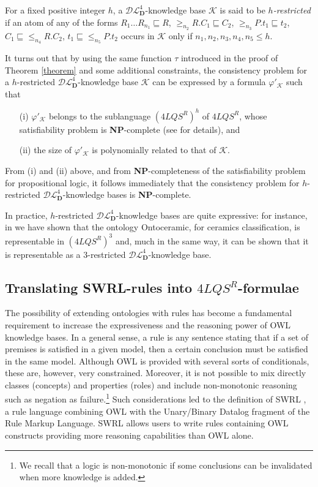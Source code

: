 \documentclass[a4paper]{llncs}
\newcommand{\shdlss}{\mathcal{DL}_{\D}^{4}}
\newcommand{\flqsr}{\ensuremath{4LQS^R}}
\newcommand{\D}{\mathbf{D}}
\begin{document}
\begin{remark}
For a fixed positive integer $h$, a $\shdlss$-knowledge base $\mathcal{K}$ is said to be \emph{$h$-restricted} if an atom of any of the forms $R_1\ldots R_{n_1} \sqsubseteq R$, $\geq_{n_2} \!\!R.C_1 \sqsubseteq C_2$, $\geq_{n_3} \!\!P.t_1 \sqsubseteq t_2$, $C_1 \sqsubseteq {\leq_{n_4} \!\!R. C_2}$, $t_1 \sqsubseteq {\leq_{n_5} \!\!P. t_2}$ occurs in $\mathcal{K}$ only if $n_1,n_2,n_3,n_4,n_5 \leq h$.

It turns out that by using the same function
$\tau$ introduced in the proof of Theorem \ref{theorem} and some additional constraints, the consistency problem for a $h$-restricted $\shdlss$-knowledge base $\mathcal{K}$ can be expressed by a formula $\varphi'_\mathcal{K}$ such that
\begin{itemize}
\item[(i)] $\varphi'_\mathcal{K}$ belongs to the sublanguage $(\flqsr)^h$ of \flqsr, whose satisfiability problem is \textbf{NP}-complete (see \cite{CanNic2013} for details), and

\item[(ii)] the size of $\varphi'_\mathcal{K}$ is polynomially related to that of $\mathcal{K}$.
\end{itemize}
From (i) and (ii) above, and from \textbf{NP}-completeness of the satisfiability problem for propositional logic, it follows immediately that the consistency problem for $h$-restricted $\shdlss$-knowledge bases is \textbf{NP}-complete.

In practice, $h$-restricted $\shdlss$-knowledge bases are quite expressive: for instance, in \cite{santaLAP} we have shown that the ontology \textsf{Ontoceramic}, for ceramics classification, is representable in $(\flqsr)^3$ and, much in the same way, it can be shown that it is representable as a $3$-restricted $\shdlss$-knowledge base.
\end{remark}








\subsection{Translating SWRL-rules into \flqsr-formulae}\label{rules}
The possibility of extending ontologies with rules has become a fundamental requirement to increase the expressiveness and the reasoning power of OWL knowledge bases. In a general sense, a rule is any sentence stating that if a set of premises is satisfied in a given model, then a certain conclusion must be satisfied in the same model. Although OWL is provided with several sorts of conditionals, these are, however, very constrained. Moreover, it is not possible to mix directly classes (concepts) and properties (roles)  and include non-monotonic reasoning such as negation as failure.\footnote{We recall that a logic is non-monotonic if some conclusions can be invalidated when more knowledge is added.}
Such considerations led to the definition of SWRL \cite{swrl}, a rule language combining OWL with the Unary/Binary Datalog fragment of the Rule Markup Language. SWRL allows users to write rules containing OWL constructs providing more reasoning capabilities than OWL alone.
\end{document}

